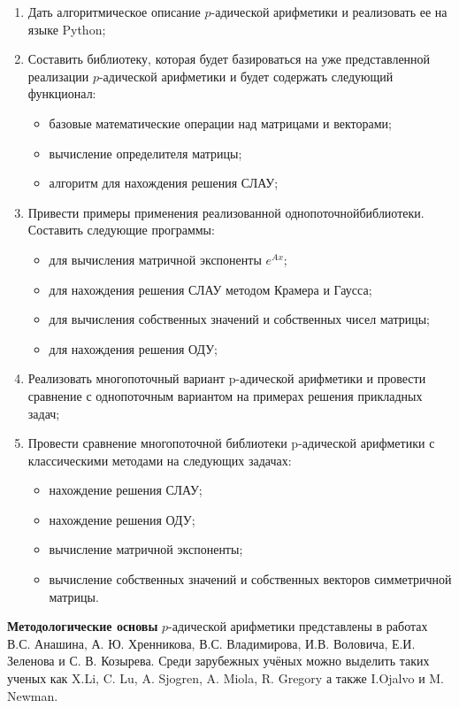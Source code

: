 \documentclass[master, och, autoref, times]{sty/SCWorks}
\theoremstyle{plain}
\theoremstyle{definition}
\numberwithin{equation}{section}
\begin{document}
\begin{enumerate}
	\item Дать алгоритмическое описание $p$-адической арифметики и \mbox{реализовать} ее на языке Python;
	\item Составить библиотеку, которая будет базироваться на уже \mbox{представленной} реализации $p$-адической арифметики и будет \mbox{содержать} следующий функционал:  
	\begin{itemize}
    \item базовые математические операции над матрицами и векторами;
    \item вычисление определителя матрицы;
    \item алгоритм для нахождения решения СЛАУ;
    \end{itemize}
    \item Привести примеры применения реализованной однопоточной\mbox{библиотеки}. Составить следующие программы:
	\begin{itemize}
    \item для вычисления матричной экспоненты $e^{Ax}$;
    \item для нахождения решения СЛАУ методом Крамера и Гаусса;
    \item для вычисления собственных значений и собственных чисел \mbox{матрицы};
    \item для нахождения решения ОДУ;
    \end{itemize}
    \item Реализовать многопоточный вариант p-адической арифметики и \mbox{провести} сравнение с однопоточным \mbox{вариантом} на примерах решения прикладных задач;
    \item Провести сравнение многопоточной библиотеки p-адической \mbox{арифметики} с классическими методами на следующих задачах:
    \begin{itemize}
    \item нахождение решения СЛАУ;
    \item нахождение решения ОДУ;    
 	\item вычисление матричной экспоненты;
 	\item вычисление собственных значений и собственных векторов \mbox{симметричной} матрицы.
    \end{itemize}
\end{enumerate}


\textbf{Методологические основы} $p$-адической арифметики представлены в работах В.С. Анашина, А. Ю. Хренникова, В.С. Владимирова, И.В. Воловича, Е.И. Зеленова и С. В. Козырева. Среди зарубежных учёных можно выделить таких ученых как X.Li, C. Lu, A. Sjogren, A. Miola, R. Gregory а также I.Ojalvo и M. Newman.
\end{document}
